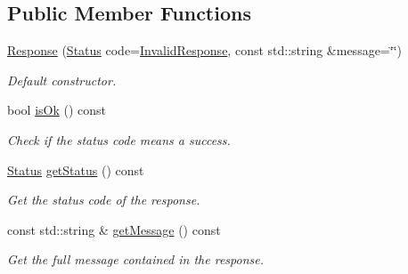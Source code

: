 \subsection*{Public Member Functions}
\begin{DoxyCompactItemize}
\item 
\mbox{\hyperlink{classsf_1_1_ftp_1_1_response_af300fffd4862774102f978eb22f85d9b}{Response}} (\mbox{\hyperlink{classsf_1_1_ftp_1_1_response_af81738f06b6f571761696291276acb3b}{Status}} code=\mbox{\hyperlink{classsf_1_1_ftp_1_1_response_af81738f06b6f571761696291276acb3ba59e041e4ef186e8ae8d6035973fc46bd}{Invalid\+Response}}, const std\+::string \&message=\char`\"{}\char`\"{})
\begin{DoxyCompactList}\small\item\em Default constructor. \end{DoxyCompactList}\item 
bool \mbox{\hyperlink{classsf_1_1_ftp_1_1_response_a5102552955a2652c1a39e9046e617b36}{is\+Ok}} () const
\begin{DoxyCompactList}\small\item\em Check if the status code means a success. \end{DoxyCompactList}\item 
\mbox{\hyperlink{classsf_1_1_ftp_1_1_response_af81738f06b6f571761696291276acb3b}{Status}} \mbox{\hyperlink{classsf_1_1_ftp_1_1_response_a52bbca9fbf5451157bc055e3d8430c25}{get\+Status}} () const
\begin{DoxyCompactList}\small\item\em Get the status code of the response. \end{DoxyCompactList}\item 
const std\+::string \& \mbox{\hyperlink{classsf_1_1_ftp_1_1_response_a4af82a0b3620c90558390e1f600abc05}{get\+Message}} () const
\begin{DoxyCompactList}\small\item\em Get the full message contained in the response. \end{DoxyCompactList}\end{DoxyCompactItemize}
